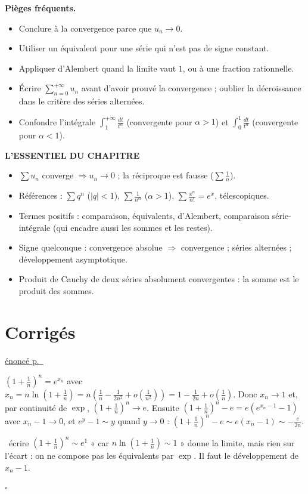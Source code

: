 \documentclass[a4paper,11pt]{article}
\numberwithin{equation}{section}
\numberwithin{figure}{section}
\numberwithin{table}{section}
\theoremstyle{enonce}
\theoremstyle{exemple}
\theoremstyle{remarque}
\newenvironment{corrige}[1]{%
  \par\needspace{6\baselineskip}\vspace{1em}\phantomsection\label{c:#1}%
  \noindent{\sffamily\bfseries\color{Bleu}Exercice~\ref{e:#1}}\quad
  {\scriptsize\sffamily\hyperref[e:#1]{\color{Gris}énoncé p.~\pageref{e:#1}}}\par\nobreak\vspace{0.2em}}%
  {\hfill\textcolor{BleuClair}{$\square$}\par}
\newenvironment{essentiel}{\par\needspace{12\baselineskip}\vspace{1.5em}%
  \begin{tcolorbox}[enhanced,unbreakable,colback=white,colframe=white,boxrule=0pt,arc=0pt,
   borderline north={1.4pt}{0pt}{Ocre},left=2pt,right=2pt,top=8pt,bottom=4pt]
  {\sffamily\bfseries\color{Ocre}L'ESSENTIEL DU CHAPITRE}\par\medskip}{\end{tcolorbox}}
\newcommand{\piege}[1]{\par\noindent{\sffamily\bfseries\small\color{Brique}Piège.}\ #1\par}
\begin{document}
\begin{attention}\textbf{Pièges fréquents.}
\begin{itemize}[leftmargin=1.1em]
\item Conclure à la convergence parce que $u_n\to0$.
\item Utiliser un équivalent pour une série qui n'est pas de signe constant.
\item Appliquer d'Alembert quand la limite vaut $1$, ou à une fraction rationnelle.
\item Écrire $\sum_{n=0}^{+\infty}u_n$ avant d'avoir prouvé la convergence ; oublier la décroissance dans le critère des séries alternées.
\item Confondre l'intégrale $\int_1^{+\infty}\frac{dt}{t^\alpha}$ (convergente pour $\alpha>1$) et $\int_0^1\frac{dt}{t^\alpha}$ (convergente pour $\alpha<1$).
\end{itemize}
\end{attention}

\begin{essentiel}
\begin{itemize}[leftmargin=1.1em,itemsep=2pt]
\item $\sum u_n$ converge $\Rightarrow u_n\to0$ ; la réciproque est fausse ($\sum\frac1n$).
\item Références : $\sum q^n$ ($|q|<1$), $\sum\frac1{n^\alpha}$ ($\alpha>1$), $\sum\frac{x^n}{n!}=e^x$, télescopiques.
\item Termes positifs : comparaison, équivalents, d'Alembert, comparaison série-intégrale (qui encadre aussi les sommes et les restes).
\item Signe quelconque : convergence absolue $\Rightarrow$ convergence ; séries alternées ; développement asymptotique.
\item Produit de Cauchy de deux séries absolument convergentes : la somme est le produit des sommes.
\end{itemize}
\end{essentiel}

\clearpage
\renewcommand{\ongletcouleur}{Ocre}
\section{Corrigés}\label{sec:corriges-series}

\begin{corrige}{s-equiv}
$\left(1+\frac1n\right)^n=e^{x_n}$ avec $x_n=n\ln\left(1+\frac1n\right)=n\left(\frac1n-\frac1{2n^2}+o\left(\frac1{n^2}\right)\right)=1-\frac1{2n}+o\left(\frac1n\right)$.
Donc $x_n\to1$ et, par continuité de $\exp$, $\left(1+\frac1n\right)^n\to e$. Ensuite
$\left(1+\frac1n\right)^n-e=e\left(e^{x_n-1}-1\right)$ avec $x_n-1\to0$, et $e^y-1\sim y$ quand $y\to0$ :
$\left(1+\frac1n\right)^n-e\sim e(x_n-1)\sim-\frac e{2n}$.
\piege{écrire $\left(1+\frac1n\right)^n\sim e^{1}$ « car $n\ln(1+\frac1n)\sim1$ » donne la limite, mais rien sur l'écart : on ne
compose pas les équivalents par $\exp$. Il faut le développement de $x_n-1$.}
\end{corrige}
\end{document}
